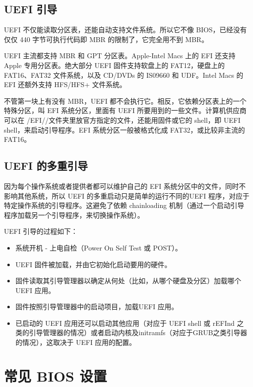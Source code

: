 \documentclass[doctor,openright,twoside]{sjtuthesis}
\providecommand{\tightlist}{%
    \setlength{\itemsep}{0pt}\setlength{\parskip}{0pt}}
\theoremstyle{plain}
\theoremstyle{definition}
\theoremstyle{remark}
\theoremstyle{ocrenumbox}
\theoremstyle{plain}
\begin{document}
\hypertarget{uefi-}{%
\subsection{UEFI 引导}\label{uefi-}}

UEFI 不仅能读取分区表，还能自动支持文件系统。所以它不像
BIOS，已经没有仅仅 440 字节可执行代码即 MBR 的限制了，它完全用不到 MBR。

UEFI 主流都支持 MBR 和 GPT 分区表。Apple-Intel Macs 上的 EFI 还支持
Apple 专用分区表。绝大部分 UEFI 固件支持软盘上的 FAT12，硬盘上的
FAT16、FAT32 文件系统，以及 CD/DVDs 的 IS09660 和 UDF。Intel Macs 的 EFI
还额外支持 HFS/HFS+ 文件系统。

不管第一块上有没有 MBR，UEFI
都不会执行它。相反，它依赖分区表上的一个特殊分区，叫 EFI
系统分区，里面有 UEFI 所要用到的一些文件。计算机供应商可以在
/EFI//文件夹里放官方指定的文件，还能用固件或它的 shell，即 UEFI
shell，来启动引导程序。EFI 系统分区一般被格式化成 FAT32，或比较非主流的
FAT16。

\hypertarget{uefi-}{%
\subsection{UEFI 的多重引导}\label{uefi-}}

因为每个操作系统或者提供者都可以维护自己的 EFI
系统分区中的文件，同时不影响其他系统，所以 UEFI
的多重启动只是简单的运行不同的UEFI
程序，对应于特定操作系统的引导程序。这避免了依赖 chainloading
机制（通过一个启动引导程序加载另一个引导程序，来切换操作系统）。

UEFI 引导的过程如下：

\begin{itemize}
\tightlist
\item
  系统开机 - 上电自检（Power On Self Test 或 POST）。
\item
  UEFI 固件被加载，并由它初始化启动要用的硬件。
\item
  固件读取其引导管理器以确定从何处（比如，从哪个硬盘及分区）加载哪个
  UEFI 应用。
\item
  固件按照引导管理器中的启动项目，加载UEFI 应用。
\item
  已启动的 UEFI 应用还可以启动其他应用（对应于 UEFI shell 或 rEFInd
  之类的引导管理器的情况）或者启动内核及initramfs（对应于GRUB之类引导器的情况），这取决于
  UEFI 应用的配置。
\end{itemize}

\hypertarget{-bios-}{%
\section{常见 BIOS 设置}\label{-bios-}}
\end{document}
